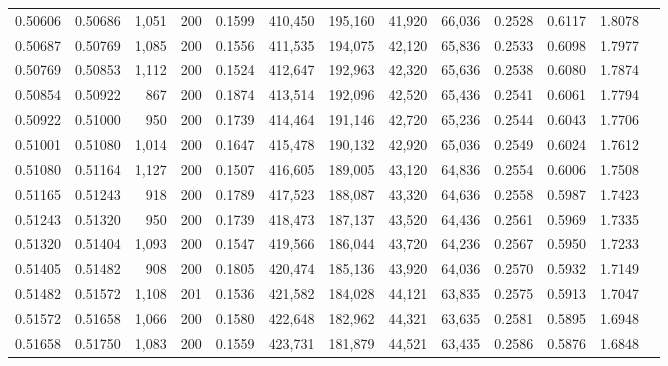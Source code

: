 \begin{tabular}{rrrrrrrrrrrrr}
0.50606 & 0.50686 & 1,051 & 200 &                                     0.1599 & 410,450 & 195,160 &  41,920 &  66,036 & 0.2528 & 0.6117 & 1.8078 \\
0.50687 & 0.50769 & 1,085 & 200 &                                     0.1556 & 411,535 & 194,075 &  42,120 &  65,836 & 0.2533 & 0.6098 & 1.7977 \\
0.50769 & 0.50853 & 1,112 & 200 &                                     0.1524 & 412,647 & 192,963 &  42,320 &  65,636 & 0.2538 & 0.6080 & 1.7874 \\
0.50854 & 0.50922 &   867 & 200 &                                     0.1874 & 413,514 & 192,096 &  42,520 &  65,436 & 0.2541 & 0.6061 & 1.7794 \\
0.50922 & 0.51000 &   950 & 200 &                                     0.1739 & 414,464 & 191,146 &  42,720 &  65,236 & 0.2544 & 0.6043 & 1.7706 \\
0.51001 & 0.51080 & 1,014 & 200 &                                     0.1647 & 415,478 & 190,132 &  42,920 &  65,036 & 0.2549 & 0.6024 & 1.7612 \\
0.51080 & 0.51164 & 1,127 & 200 &                                     0.1507 & 416,605 & 189,005 &  43,120 &  64,836 & 0.2554 & 0.6006 & 1.7508 \\
0.51165 & 0.51243 &   918 & 200 &                                     0.1789 & 417,523 & 188,087 &  43,320 &  64,636 & 0.2558 & 0.5987 & 1.7423 \\
0.51243 & 0.51320 &   950 & 200 &                                     0.1739 & 418,473 & 187,137 &  43,520 &  64,436 & 0.2561 & 0.5969 & 1.7335 \\
0.51320 & 0.51404 & 1,093 & 200 &                                     0.1547 & 419,566 & 186,044 &  43,720 &  64,236 & 0.2567 & 0.5950 & 1.7233 \\
0.51405 & 0.51482 &   908 & 200 &                                     0.1805 & 420,474 & 185,136 &  43,920 &  64,036 & 0.2570 & 0.5932 & 1.7149 \\
0.51482 & 0.51572 & 1,108 & 201 &                                     0.1536 & 421,582 & 184,028 &  44,121 &  63,835 & 0.2575 & 0.5913 & 1.7047 \\
0.51572 & 0.51658 & 1,066 & 200 &                                     0.1580 & 422,648 & 182,962 &  44,321 &  63,635 & 0.2581 & 0.5895 & 1.6948 \\
0.51658 & 0.51750 & 1,083 & 200 &                                     0.1559 & 423,731 & 181,879 &  44,521 &  63,435 & 0.2586 & 0.5876 & 1.6848 \\

\end{tabular}
